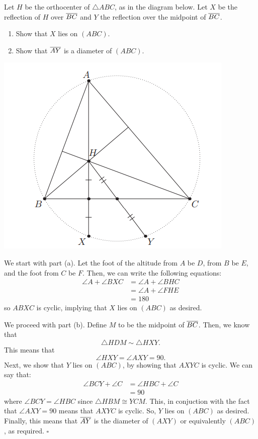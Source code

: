 \documentclass{article}
\begin{document}
\begin{problem}[1.17]{}
Let $H$ be the orthocenter of $\triangle ABC$, as in the diagram below. Let $X$ be the reflection of $H$ over $\overline{BC}$ and $Y$ the reflection over the midpoint of $\overline{BC}$.
\begin{enumerate}[label=(\alph*)]
    \item Show that $X$ lies on $(ABC)$.
    \item Show that $\overline{AY}$ is a diameter of $(ABC)$.
\end{enumerate}

\begin{center}
\includegraphics[width=0.35\linewidth]{Figure 1.3B.png}
\end{center}
\end{problem}
We start with part (a). Let the foot of the altitude from $A$ be $D$, from $B$ be $E$, and the foot from $C$ be $F$. Then, we can write the following equations:
\begin{align*}
\angle A + \angle BXC &= \angle A + \angle BHC \\
&= \angle A + \angle FHE \\
&= 180
\end{align*}
so $ABXC$ is cyclic, implying that $X$ lies on $(ABC)$ as desired. 

We proceed with part (b). Define $M$ to be the midpoint of $\overline{BC}$. Then, we know that \[\triangle HDM \sim \triangle HXY.\] This means that \[\angle HXY = \angle AXY = 90.\] Next, we show that $Y$ lies on $(ABC)$, by showing that $AXYC$ is cyclic. We can say that:
\begin{align*}
\angle BCY + \angle C &= \angle HBC + \angle C \\
&= 90
\end{align*}
where $\angle BCY = \angle HBC$ since $\triangle HBM \cong YCM$. This, in conjuction with the fact that $\angle AXY = 90$ means that $AXYC$ is cyclic. So, $Y$ lies on $(ABC)$ as desired. Finally, this means that $\overline{AY}$ is the diameter of $(AXY)$ or equivalently $(ABC)$, as required. $\square$
\end{document}
